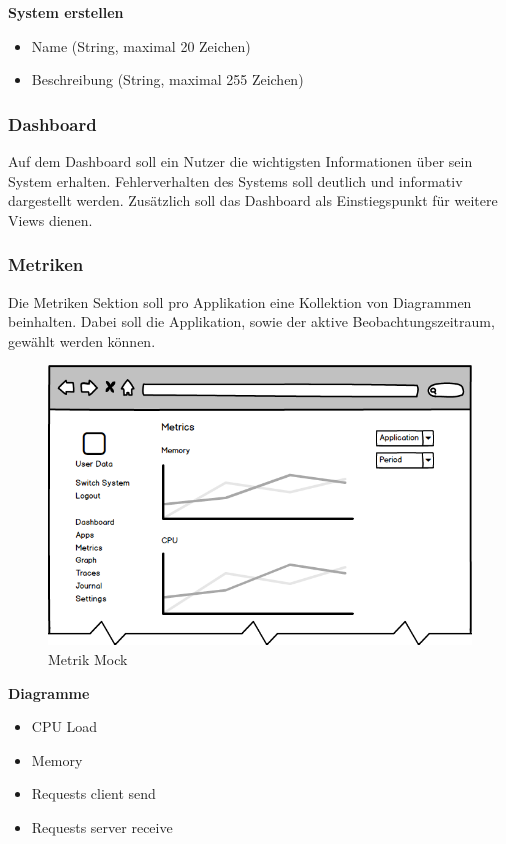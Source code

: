 \textbf{System erstellen}

\begin{itemize}
\item Name (String, maximal 20 Zeichen)
\item Beschreibung (String, maximal 255 Zeichen)
\end{itemize}


\subsubsection{Dashboard}

Auf dem Dashboard soll ein Nutzer die wichtigsten Informationen über sein System erhalten.
Fehlerverhalten des Systems soll deutlich und informativ dargestellt werden.
Zusätzlich soll das Dashboard als Einstiegspunkt für weitere Views dienen.

\subsubsection{Metriken}

Die Metriken Sektion soll pro Applikation eine Kollektion von Diagrammen beinhalten.
Dabei soll die Applikation, sowie der aktive Beobachtungszeitraum, gewählt werden können.

\begin{figure}[h]
 \centering
 \includegraphics[width=0.6\linewidth]{kapitel1/mocks/metrics.png}
 \caption{Metrik Mock}
  \label{fig:metrics}
\end{figure}

\textbf{Diagramme}

\begin{itemize}
\item CPU Load
\item Memory
\item Requests client send
\item Requests server receive
\end{itemize}


